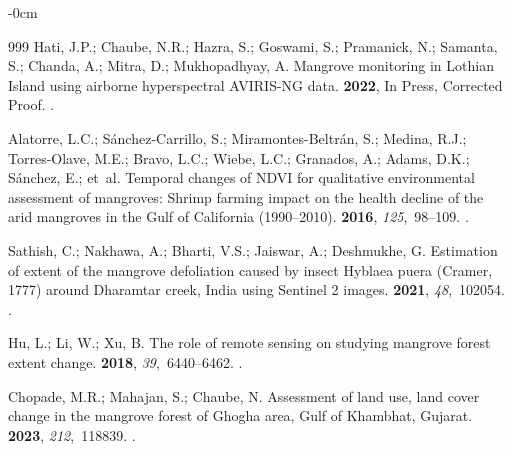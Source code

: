 \documentclass[jmse,article,accept,pdftex,moreauthors]{Definitions/mdpi}
\begin{document}
\begin{adjustwidth}{-\extralength}{0cm}
\begin{thebibliography}{999}
Hati, J.P.; Chaube, N.R.; Hazra, S.; Goswami, S.; Pramanick, N.; Samanta, S.;
  Chanda, A.; Mitra, D.; Mukhopadhyay, A.
\newblock Mangrove monitoring in Lothian Island using airborne hyperspectral
  AVIRIS-NG data.
 {\bf 2022}, In Press, Corrected Proof.
.

Alatorre, L.C.; Sánchez-Carrillo, S.; Miramontes-Beltrán, S.; Medina, R.J.;
  Torres-Olave, M.E.; Bravo, L.C.; Wiebe, L.C.; Granados, A.; Adams, D.K.;
  Sánchez, E.;  et~al.
\newblock Temporal changes of NDVI for qualitative environmental assessment of
  mangroves: Shrimp farming impact on the health decline of the arid mangroves
  in the Gulf of California (1990–2010).
 {\bf 2016}, {\em 125},~98--109.
.

Sathish, C.; Nakhawa, A.; Bharti, V.S.; Jaiswar, A.; Deshmukhe, G.
\newblock Estimation of extent of the mangrove defoliation caused by insect
  Hyblaea puera (Cramer, 1777) around Dharamtar creek, India using Sentinel 2
  images.
 {\bf 2021}, {\em 48},~102054.
.

Hu, L.; Li, W.; Xu, B.
\newblock The role of remote sensing on studying mangrove forest extent change.
 {\bf 2018}, {\em 39},~6440--6462.
.

Chopade, M.R.; Mahajan, S.; Chaube, N.
\newblock Assessment of land use, land cover change in the mangrove forest of
  Ghogha area, Gulf of Khambhat, Gujarat.
 {\bf 2023}, {\em 212},~118839.
.


\end{thebibliography}
\end{adjustwidth}
\end{document}
